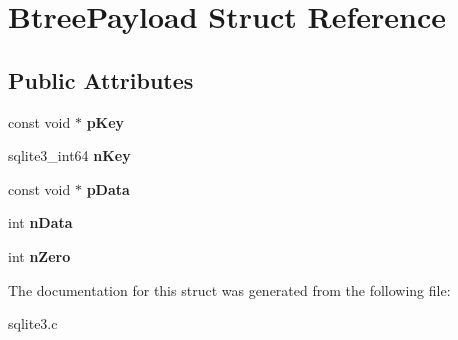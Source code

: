 \hypertarget{structBtreePayload}{}\section{Btree\+Payload Struct Reference}
\label{structBtreePayload}
\subsection*{Public Attributes}
\begin{DoxyCompactItemize}
\item 
const void $\ast$ {\bfseries p\+Key}\hypertarget{structBtreePayload_a8122b6f070adf318fe4d5131cf877ef3}{}\label{structBtreePayload_a8122b6f070adf318fe4d5131cf877ef3}

\item 
sqlite3\+\_\+int64 {\bfseries n\+Key}\hypertarget{structBtreePayload_ab47f827f8ad41b179f25693d867795a5}{}\label{structBtreePayload_ab47f827f8ad41b179f25693d867795a5}

\item 
const void $\ast$ {\bfseries p\+Data}\hypertarget{structBtreePayload_af45874b2d6119c220280e4ebcd917662}{}\label{structBtreePayload_af45874b2d6119c220280e4ebcd917662}

\item 
int {\bfseries n\+Data}\hypertarget{structBtreePayload_a515a370eeb96e103dd716fa5149f2787}{}\label{structBtreePayload_a515a370eeb96e103dd716fa5149f2787}

\item 
int {\bfseries n\+Zero}\hypertarget{structBtreePayload_ab9c8ecd88e88f7374f95c8b4bccdf946}{}\label{structBtreePayload_ab9c8ecd88e88f7374f95c8b4bccdf946}

\end{DoxyCompactItemize}


The documentation for this struct was generated from the following file\+:\begin{DoxyCompactItemize}
\item 
sqlite3.\+c\end{DoxyCompactItemize}
